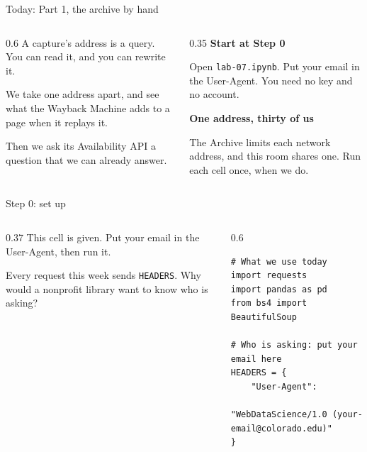 \documentclass[9pt,aspectratio=169]{beamer}
\begin{document}
\begin{frame}{Today: Part 1, the archive by hand}
    \begin{columns}[T]
        \begin{column}{0.6\textwidth}
            A capture's address is a query. You can read it, and you can rewrite it.

            \medskip
            We take one address apart, and see what the Wayback Machine adds to a page when it replays it.

            \medskip
            Then we ask its Availability API a question that we can already answer.
        \end{column}
        \begin{column}{0.35\textwidth}
            \textbf{Start at Step 0}\\[2pt]
            {\footnotesize Open \texttt{lab-07.ipynb}. Put your email in the User-Agent. You need no key and no account.\par}
            \medskip
            \textbf{One address, thirty of us}\\[2pt]
            {\footnotesize The Archive limits each network address, and this room shares one. Run each cell once, when we do.\par}
        \end{column}
    \end{columns}
\end{frame}

\begin{frame}[fragile]{Step 0: set up}
    \begin{columns}[T]
        \begin{column}{0.37\textwidth}
            This cell is given. Put your email in the User-Agent, then run it.

            \medskip
            Every request this week sends \texttt{HEADERS}. Why would a nonprofit library want to know who is asking?
        \end{column}
        \begin{column}{0.6\textwidth}
\begin{lstlisting}
# What we use today
import requests
import pandas as pd
from bs4 import BeautifulSoup

# Who is asking: put your email here
HEADERS = {
    "User-Agent":
        "WebDataScience/1.0 (your-email@colorado.edu)"
}
\end{lstlisting}
        \end{column}
    \end{columns}
\end{frame}
\end{document}
